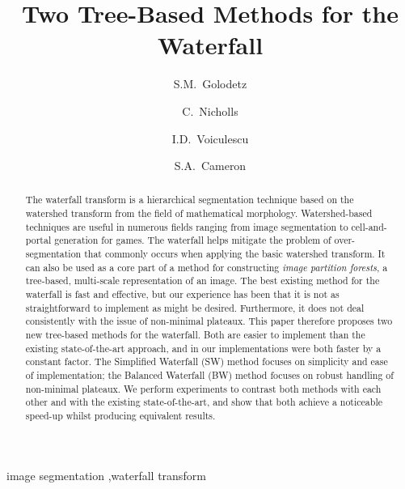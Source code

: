 \documentclass[preprint,a4paper]{elsarticle}
\begin{document}
\begin{frontmatter}

\title{Two Tree-Based Methods for the Waterfall}

\author[ox]{S.M.~Golodetz}

\author[ox]{C.~Nicholls}

\author[ox]{I.D.~Voiculescu}

\author[ox]{S.A.~Cameron}


\address[ox]{Department of Computer Science, University of Oxford, Wolfson Building, Parks Road, Oxford, OX1 3QD, United Kingdom}

\begin{abstract}
The waterfall transform is a hierarchical segmentation technique based on the watershed transform from the field of mathematical morphology. Watershed-based techniques are useful in numerous fields ranging from image segmentation to cell-and-portal generation for games. The waterfall helps mitigate the problem of over-segmentation that commonly occurs when applying the basic watershed transform. It can also be used as a core part of a method for constructing \emph{image partition forests}, a tree-based, multi-scale representation of an image. The best existing method for the waterfall is fast and effective, but our experience has been that it is not as straightforward to implement as might be desired. Furthermore, it does not deal consistently with the issue of non-minimal plateaux. This paper therefore proposes two new tree-based methods for the waterfall. Both are easier to implement than the existing state-of-the-art approach, and in our implementations were both faster by a constant factor. The Simplified Waterfall (SW) method focuses on simplicity and ease of implementation; the Balanced Waterfall (BW) method focuses on robust handling of non-minimal plateaux. We perform experiments to contrast both methods with each other and with the existing state-of-the-art, and show that both achieve a noticeable speed-up whilst producing equivalent results.
\end{abstract}

\begin{keyword}
image segmentation \sep waterfall transform
\end{keyword}

\end{frontmatter}
\end{document}
